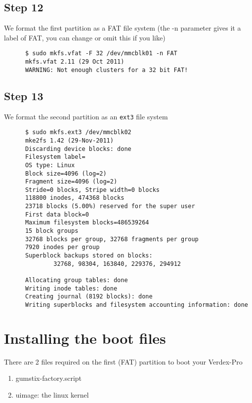 \documentclass{article}
\begin{document}
   \subsection*{Step 12}
      We format the first partition as a FAT file system (the -n parameter
      gives it a label of FAT, you can change or omit this if you like)
      \begin{verbatim}
      $ sudo mkfs.vfat -F 32 /dev/mmcblk01 -n FAT 
      mkfs.vfat 2.11 (29 Oct 2011) 
      WARNING: Not enough clusters for a 32 bit FAT!
      \end{verbatim}
   \subsection*{Step 13}
      We format the second partition as an \texttt{ext3} file system
      \begin{verbatim} 
      $ sudo mkfs.ext3 /dev/mmcblk02 
      mke2fs 1.42 (29-Nov-2011)
      Discarding device blocks: done                            
      Filesystem label=
      OS type: Linux
      Block size=4096 (log=2)
      Fragment size=4096 (log=2)
      Stride=0 blocks, Stripe width=0 blocks
      118800 inodes, 474368 blocks
      23718 blocks (5.00%) reserved for the super user
      First data block=0
      Maximum filesystem blocks=486539264
      15 block groups
      32768 blocks per group, 32768 fragments per group
      7920 inodes per group
      Superblock backups stored on blocks: 
              32768, 98304, 163840, 229376, 294912

      Allocating group tables: done                            
      Writing inode tables: done                            
      Creating journal (8192 blocks): done
      Writing superblocks and filesystem accounting information: done 
      \end{verbatim}
   \section*{Installing the boot files}
      There are 2 files required on the first (FAT) partition to boot your
      Verdex-Pro
      \begin{enumerate}
      \item gumstix-factory.script
      \item uimage: the linux kernel
      \end{enumerate}
\end{document}
